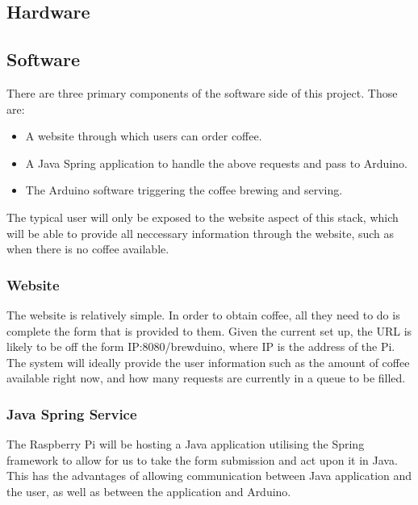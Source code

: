 \documentclass[12pt, a4paper]{article}
\begin{document}
\subsection{Hardware}
\subsection{Software}
There are three primary components of the software side of this project. Those
are:
\begin{itemize}
	\item A website through which users can order coffee.
	\item A Java Spring application to handle the above requests and pass to
	Arduino.
	\item The Arduino software triggering the coffee brewing and serving.
\end{itemize}
The typical user will only be exposed to the website aspect of this stack, which
will be able to provide all neccessary information through the website, such as
when there is no coffee available.

\subsubsection{Website}
The website is relatively simple. In order to obtain coffee, all they need to
do is complete the form that is provided to them. Given the current set up, the
URL is likely to be off the form IP:8080/brewduino, where IP is the address of
the Pi. The system will ideally provide the user information such as the amount
of coffee available right now, and how many requests are currently in a queue to
be filled.

\subsubsection{Java Spring Service}
The Raspberry Pi will be hosting a Java application utilising the Spring
framework to allow for us to take the form submission and act upon it in Java.
This has the advantages of allowing communication between Java application and
the user, as well as between the application and Arduino.
\end{document}
